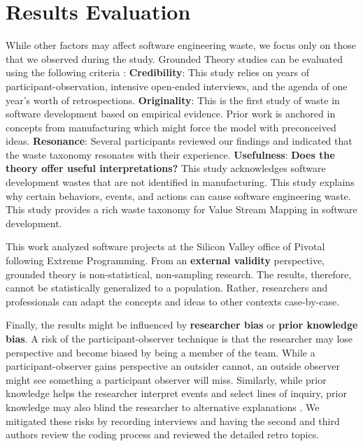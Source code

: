 \section{Results Evaluation}
\label{ResultsEvaluation}
While other factors may affect software engineering waste, we focus only on those that we observed during the study. Grounded Theory studies can be evaluated using the following criteria \cite{Charmaz, StolGroundedTheory}:
\textbf{Credibility}:   This study relies on \durationOfResearchStudyPlural{} years of participant-observation, \numberOfInterviews{} intensive open-ended interviews, and the agenda of one year's worth of retrospections. 
\textbf{Originality}:   This is the first study of waste in software development based on empirical evidence. Prior work is anchored in concepts from manufacturing which might force the model with preconceived ideas. 
\textbf{Resonance}:  Several participants reviewed our findings and indicated that the waste taxonomy resonates with their experience.
\textbf{Usefulness}: \textbf{Does the theory offer useful interpretations?} This study acknowledges software development wastes that are not identified in manufacturing. This study explains why certain behaviors, events, and actions can cause software engineering waste. This study provides a rich waste taxonomy for Value Stream Mapping in software development. 

This work analyzed software projects at the Silicon Valley office of Pivotal following Extreme Programming. From an \textbf{external validity} perspective, grounded theory is non-statistical, non-sampling research. The results, therefore, cannot be statistically generalized to a population. Rather, researchers and professionals can adapt the concepts and ideas to other contexts case-by-case.

Finally, the results might be influenced by \textbf{researcher bias} or \textbf{prior knowledge bias}. A risk of the participant-observer technique is that the researcher may lose perspective and become biased by being a member of the team. While a participant-observer gains perspective an outsider cannot, an outside observer might see something a participant observer will miss. Similarly, while prior knowledge helps the researcher interpret events and select lines of inquiry, prior knowledge may also blind the researcher to alternative explanations \cite{GlaserIssues}. We mitigated these risks by recording interviews and having the second and third authors review the coding process and reviewed the detailed retro topics.

